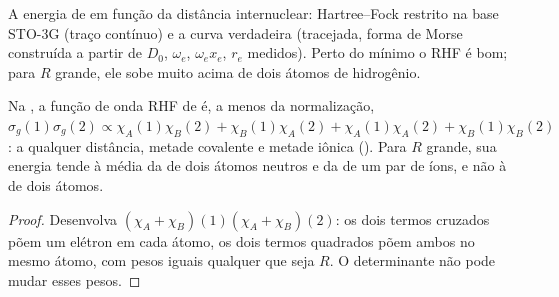 \begin{omfigure}

{\small A energia de  em função da distância internuclear: Hartree--Fock
restrito na base STO-3G (traço contínuo) e a curva verdadeira (tracejada,
forma de Morse construída a partir de $D_0$, $\omega_e$, $\omega_ex_e$, $r_e$
medidos). Perto do mínimo o RHF é bom; para $R$ grande, ele sobe muito acima
de dois átomos de hidrogênio.}
\end{omfigure}

\begin{proposition}\label{prop:b3:computational-chemistry:rhf-dissociation}
Na , a função de onda RHF de  é, a menos da
normalização, $\sigma_g(1)\sigma_g(2) \propto \chi_A(1)\chi_B(2) + \chi_B(1)\chi_A(2)
+ \chi_A(1)\chi_A(2) + \chi_B(1)\chi_B(2)$: a qualquer distância, metade covalente e
metade iônica (). Para $R$ grande, sua energia tende à média da de dois
átomos neutros e da de um par de íons, e não à de dois átomos.
\end{proposition}

\begin{proof}
Desenvolva $(\chi_A + \chi_B)(1)(\chi_A + \chi_B)(2)$: os dois termos cruzados põem
um elétron em cada átomo, os dois termos quadrados põem ambos no mesmo átomo,
com pesos iguais qualquer que seja $R$. O determinante não pode mudar esses pesos.
\end{proof}

